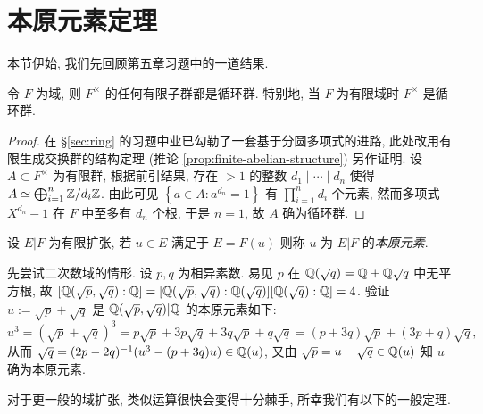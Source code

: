 \section{本原元素定理}
本节伊始, 我们先回顾第五章习题中的一道结果.
\begin{theorem}\label{prop:field-subgroup-cyclic}
	令 $F$ 为域, 则 $F^\times$ 的任何有限子群都是循环群. 特别地, 当 $F$ 为有限域时 $F^\times$ 是循环群.
\end{theorem}
\begin{proof}
	在 \S\ref{sec:ring} 的习题中业已勾勒了一套基于分圆多项式的进路, 此处改用有限生成交换群的结构定理 (推论 \ref{prop:finite-abelian-structure}) 另作证明. 设 $A \subset F^\times$ 为有限群, 根据前引结果, 存在 $> 1$ 的整数 $d_1 \mid \cdots \mid d_n$ 使得 $A \simeq \bigoplus_{i=1}^n \mathbb{Z}/d_i\mathbb{Z}$. 由此可见 $\left\{a\in A: a^{d_n}=1 \right\}$ 有 $\prod_{i=1}^n d_i$ 个元素, 然而多项式 $X^{d_n}-1$ 在 $F$ 中至多有 $d_n$ 个根, 于是 $n=1$, 故 $A$ 确为循环群.
\end{proof}

\begin{definition}
	设 $E|F$ 为有限扩张, 若 $u \in E$ 满足于 $E=F(u)$ 则称 $u$ 为 $E|F$ 的\emph{本原元素}.
\end{definition}

\begin{example}
	先尝试二次数域的情形. 设 $p,q$ 为相异素数. 易见 $p$ 在 $\mathbb{Q}(\sqrt{q}) = \mathbb{Q} + \mathbb{Q}\sqrt{q}$ 中无平方根, 故 $[\mathbb{Q}(\sqrt{p},\sqrt{q}): \mathbb{Q}] = [\mathbb{Q}(\sqrt{p},\sqrt{q}):\mathbb{Q}(\sqrt{q})] [\mathbb{Q}(\sqrt{q}):\mathbb{Q}] = 4$. 验证 $u := \sqrt{p}+\sqrt{q}$ 是 $\mathbb{Q}(\sqrt{p}, \sqrt{q})|\mathbb{Q}$ 的本原元素如下:
	\[ u^3 = \left( \sqrt{p}+\sqrt{q} \right)^3 = p\sqrt{p} + 3p\sqrt{q} + 3q\sqrt{p} + q\sqrt{q} = (p+3q)\sqrt{p} + (3p+q)\sqrt{q}, \]
	从而 $\sqrt{q} = (2p-2q)^{-1}(u^3 - (p+3q)u) \in \mathbb{Q}(u)$, 又由 $\sqrt{p} = u - \sqrt{q} \in \mathbb{Q}(u)$ 知 $u$ 确为本原元素.
\end{example}
对于更一般的域扩张, 类似运算很快会变得十分棘手, 所幸我们有以下的一般定理.

